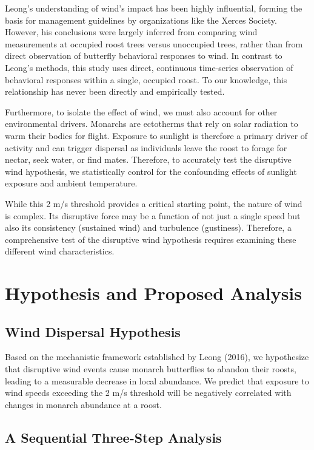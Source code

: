 Leong's understanding of wind's impact has been highly influential, forming the basis for management guidelines by organizations like the Xerces Society. However, his conclusions were largely inferred from comparing wind measurements at occupied roost trees versus unoccupied trees, rather than from direct observation of butterfly behavioral responses to wind. In contrast to Leong's methods, this study uses direct, continuous time-series observation of behavioral responses within a single, occupied roost. To our knowledge, this relationship has never been directly and empirically tested.

Furthermore, to isolate the effect of wind, we must also account for other environmental drivers. Monarchs are ectotherms that rely on solar radiation to warm their bodies for flight. Exposure to sunlight is therefore a primary driver of activity and can trigger dispersal as individuals leave the roost to forage for nectar, seek water, or find mates. Therefore, to accurately test the disruptive wind hypothesis, we statistically control for the confounding effects of sunlight exposure and ambient temperature.

While this 2 m/s threshold provides a critical starting point, the nature of wind is complex. Its disruptive force may be a function of not just a single speed but also its consistency (sustained wind) and turbulence (gustiness). Therefore, a comprehensive test of the disruptive wind hypothesis requires examining these different wind characteristics.

\section{Hypothesis and Proposed Analysis}

\subsection{Wind Dispersal Hypothesis}

Based on the mechanistic framework established by Leong (2016), we hypothesize that disruptive wind events cause monarch butterflies to abandon their roosts, leading to a measurable decrease in local abundance. We predict that exposure to wind speeds exceeding the 2 m/s threshold will be negatively correlated with changes in monarch abundance at a roost.

\subsection{A Sequential Three-Step Analysis}

